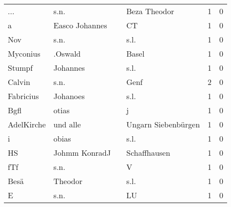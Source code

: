 \documentclass[10pt,a4paper,landscape]{article}
\begin{document}
\begin{longtable}{llllrr}
                      ... &                               s.n. &             &                                Beza Theodor &          1 &         0 \\
                        a &                     Easco Johannes &             &                                          CT &          1 &         0 \\
                      Nov &                               s.n. &             &                                        s.l. &          1 &         0 \\
                 Myconius &                            .Oswald &             &                                       Basel &          1 &         0 \\
                   Stumpf &                           Johannes &             &                                        s.l. &          1 &         0 \\
                   Calvin &                               s.n. &             &                                        Genf &          2 &         0 \\
                Fabricius &                           Johanoes &             &                                        s.l. &          1 &         0 \\
                     Bgfl &                              otias &             &                                           j &          1 &         0 \\
               AdelKirche &                           und alle &             &                         Ungarn Siebenbürgen &          1 &         0 \\
                        i &                              obias &             &                                        s.l. &          1 &         0 \\
                       HS &                      Johmm KonradJ &             &                                Schaffhausen &          1 &         0 \\
                      fTf &                               s.n. &             &                                           V &          1 &         0 \\
                     Besä &                            Theodor &             &                                        s.l. &          1 &         0 \\
                        E &                               s.n. &             &                                          LU &          1 &         0 \\

\end{longtable}
\end{document}
